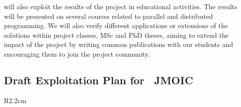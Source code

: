 \documentclass[a4paper,11pt]{article}
\begin{document}
\AGHshort{} will also exploit the results of the project in educational
activities. The results will be presented on several courses related to
parallel and distributed programming. We will also verify different applications or
extensions of the solutions within project classes, MSc and PhD
theses, aiming to extend the impact of the project by writing common
publications with our students and encouraging them to join the project
community.

\horizontalline

\subsection*{Draft Exploitation Plan for \ JMOIC{}}
\vspace{-6pt} 

\begin{wrapfigure}{R}{2.2cm}
\vspace{-1.1cm}
\hfill {}
\vspace{-0.7cm}
\end{wrapfigure}
\end{document}
